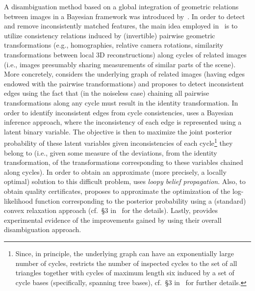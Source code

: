 \documentclass[10pt]{article}
\begin{document}
A disambiguation method based on a global integration of geometric relations between images in a Bayesian framework was introduced by~\cite{ZachDisambig}. In order to detect and remove inconsistently matched features, the main idea employed in~\cite{ZachDisambig} is to utilize consistency relations induced by (invertible) pairwise geometric transformations (e.g., homographies, relative camera rotations, similarity transformations between local $3$D reconstructions) along cycles of related images (i.e., images presumably sharing measurements of similar parts of the scene). More concretely, \cite{ZachDisambig} considers the underlying graph of related images (having edges endowed with the pairwise transformations) and proposes to detect inconsistent edges using the fact that (in the noiseless case) chaining all pairwise transformations along any cycle must result in the identity transformation. In order to identify inconsistent edges from cycle consistencies, \cite{ZachDisambig} uses a Bayesian inference approach, where the inconsistency of each edge is represented using a latent binary variable. The objective is then to maximize the joint posterior probability of these latent variables given inconsistencies of each cycle\footnote{Since, in principle, the underlying graph can have an exponentially large number of cycles, \cite{ZachDisambig} restricts the number of inspected cycles to the set of all triangles together with cycles of maximum length six induced by a set of cycle bases (specifically, spanning tree bases), cf.~\S3 in~\cite{ZachDisambig} for further details.} they belong to (i.e., given some measure of the deviations, from the identity transformation, of the transformations corresponding to these variables chained along cycles). In order to obtain an approximate (more precisely, a locally optimal) solution to this difficult problem, \cite{ZachDisambig} uses \textit{loopy belief propagation}. Also, to obtain quality certificates, \cite{ZachDisambig} proposes to approximate the optimization of the log-likelihood function corresponding to the posterior probability using a (standard) convex relaxation approach (cf.~\S3 in~\cite{ZachDisambig} for the details). Lastly, \cite{ZachDisambig} provides experimental evidence of the improvements gained by using their overall disambiguation approach.
\end{document}
